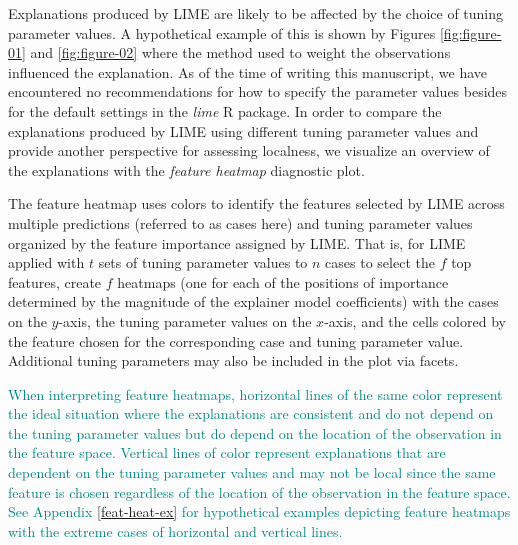 \documentclass[AMS,STIX2COL]{WileyNJD-v2}\usepackage[]{graphicx}\usepackage[]{color}
\newcommand{\kge}[1]{\textcolor{teal}{#1}}
\begin{document}
Explanations produced by LIME are likely to be affected by the choice of tuning parameter values. A hypothetical example of this is shown by Figures \ref{fig:figure-01} and \ref{fig:figure-02} where the method used to weight the observations influenced the explanation. As of the time of writing this manuscript, we have encountered no recommendations for how to specify the parameter values besides for the default settings in the \emph{lime} R package. In order to compare the explanations produced by LIME using different tuning parameter values and provide another perspective for assessing localness, we visualize an overview of the explanations with the \emph{feature heatmap} diagnostic plot. 

The feature heatmap uses colors to identify the features selected by LIME across multiple predictions (referred to as cases here) and tuning parameter values organized by the feature importance assigned by LIME. That is, for LIME applied with $t$ sets of tuning parameter values to $n$ cases to select the $f$ top features, create $f$ heatmaps (one for each of the positions of importance determined by the magnitude of the explainer model coefficients) with the cases on the $y$-axis, the tuning parameter values on the $x$-axis, and the cells colored by the feature chosen for the corresponding case and tuning parameter value. Additional tuning parameters may also be included in the plot via facets. 

\kge{When interpreting feature heatmaps, horizontal lines of the same color represent the ideal situation where the explanations are consistent and do not depend on the tuning parameter values but do depend on the location of the observation in the feature space. Vertical lines of color represent explanations that are dependent on the tuning parameter values and may not be local since the same feature is chosen regardless of the location of the observation in the feature space. See Appendix \ref{feat-heat-ex} for hypothetical examples depicting feature heatmaps with the extreme cases of horizontal and vertical lines.}
\end{document}
